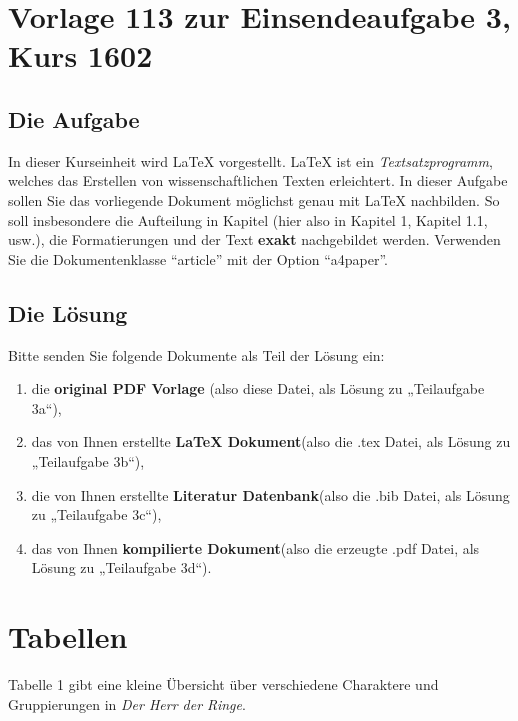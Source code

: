 \documentclass[a4paper]{article}
\begin{document}
	\section{Vorlage 113 zur Einsendeaufgabe 3, Kurs 1602}

	\subsection{Die Aufgabe}

	\noindent In dieser Kurseinheit wird LaTeX vorgestellt. LaTeX ist ein \textit{Textsatzprogramm}, welches das Erstellen von wissenschaftlichen Texten erleichtert. In dieser Aufgabe sollen Sie das vorliegende Dokument möglichst genau mit LaTeX nachbilden. So soll insbesondere die Aufteilung in Kapitel (hier also in Kapitel 1, Kapitel 1.1, usw.), die Formatierungen und der Text \textbf{exakt}
    nachgebildet werden. Verwenden Sie die Dokumentenklasse \enquote{article} mit der Option \enquote{a4paper}.
	
	\subsection{Die Lösung}
   \smallbreak
	Bitte senden Sie folgende Dokumente als Teil der Lösung ein:
	
	\begin{enumerate}
	 	\item 
	 	die \textbf{original PDF Vorlage} (also diese Datei, als Lösung zu „Teilaufgabe 3a“),
	 	
	 	\item 
	 	das von Ihnen erstellte \textbf{LaTeX Dokument}(also die .tex Datei, als Lösung  zu „Teilaufgabe 3b“),
	 
	 	\item 
	 	die von Ihnen erstellte \textbf{Literatur Datenbank}(also die .bib Datei, als Lösung zu „Teilaufgabe 3c“),
	 	
	 	\item 
		das von Ihnen \textbf{kompilierte Dokument}(also die erzeugte .pdf Datei, als Lösung zu „Teilaufgabe 3d“).
    \end{enumerate}	

	\section{Tabellen}
	
	Tabelle 1 gibt eine kleine Übersicht über verschiedene Charaktere und Gruppierungen in \textit{Der Herr der Ringe}.
	
\end{document}
